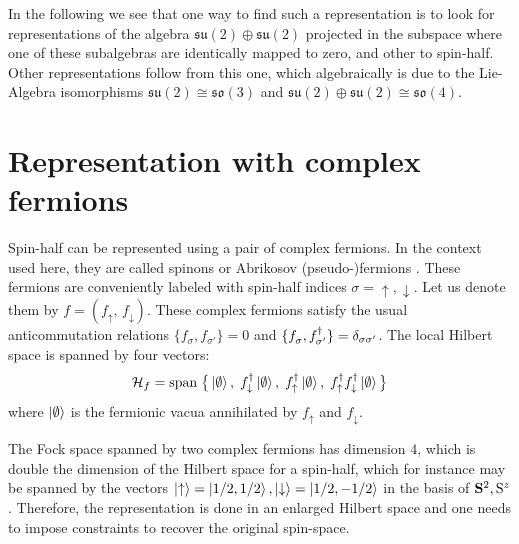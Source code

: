 In the following we see that one way to find such a representation is to look for representations of the algebra $\mathfrak{su}(2)\oplus \mathfrak{su}(2)$ projected in the subspace where one of these subalgebras are identically mapped to zero, and other to spin-half.
Other representations follow from this one, which algebraically is due to the Lie-Algebra isomorphisms $\mathfrak{su}(2) \cong \mathfrak{so}(3)$ and $\mathfrak{su}(2)\oplus \mathfrak{su}(2) \cong \mathfrak{so}(4)$.


\section{Representation with complex fermions}
Spin-half can be represented using a pair of complex fermions.
In the context used here, they are called spinons %
or Abrikosov (pseudo-)fermions \cite{Abrikosov1965}.
These fermions are conveniently labeled with spin-half indices $\sigma=\uparrow,\downarrow$. Let us denote them by $f =(f_{\uparrow}, \, f_{\downarrow})$. These complex fermions satisfy the usual anticommutation relations $\{ f_{\sigma}, f_{\sigma'} \} = 0$ and   $\{ f_{\sigma}^\pd, f_{\sigma'}^\dagger \} = \delta_{\sigma\sigma'}$.
The local Hilbert space is spanned by four vectors: \begin{equation}
    \mathcal{H}_f=\mathrm{span}\; \big\{
    \ket{\emptyset},  \;
    f_{\downarrow}^\dagger \ket{\emptyset}, \;
    f_{\uparrow}^\dagger \ket{\emptyset},\;
    f_{\uparrow}^\dagger f_{\downarrow}^\dagger \ket{\emptyset}
    \big\}
\end{equation}
 where $\ket{\emptyset}$ is the fermionic vacua annihilated by $f_{\uparrow}$ and $f_{\downarrow}$.



 The Fock space spanned by two complex fermions has dimension $4$, which is double the dimension of the Hilbert space for a spin-half, which for instance may be spanned by the vectors $\ket{\uparrow}=\ket{1/2,1/2}, \ket{\downarrow}= \ket{1/2,-1/2}$ in the basis of $\mathbf{S}^2, \mathrm{S}^z $.
 Therefore, the representation is done in an enlarged Hilbert space and one needs to impose constraints to recover the original spin-space.

